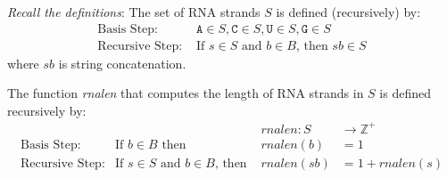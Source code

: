 \documentclass[12pt, oneside]{article}
\newcommand{\A}[0]{\texttt{A}}
\newcommand{\C}[0]{\texttt{C}}
\newcommand{\G}[0]{\texttt{G}}
\newcommand{\U}[0]{\texttt{U}}
\begin{document}
{\it Recall the definitions}: The set of RNA strands $S$ is defined (recursively) by:
\[
\begin{array}{ll}
\textrm{Basis Step: } & \A \in S, \C \in S, \U \in S, \G \in S \\
\textrm{Recursive Step: } & \textrm{If } s \in S\textrm{ and }b \in B \textrm{, then }sb \in S
\end{array}
\]
where $sb$ is string concatenation.

The function \textit{rnalen} that computes the length of RNA strands in $S$ is defined recursively by:
\[
\begin{array}{llll}
& & \textit{rnalen} : S & \to \mathbb{Z}^+ \\
\textrm{Basis Step:} & \textrm{If } b \in B\textrm{ then } & \textit{rnalen}(b) & = 1 \\
\textrm{Recursive Step:} & \textrm{If } s \in S\textrm{ and }b \in B\textrm{, then  } & \textit{rnalen}(sb) & = 1 + \textit{rnalen}(s)
\end{array}
\]
\end{document}
